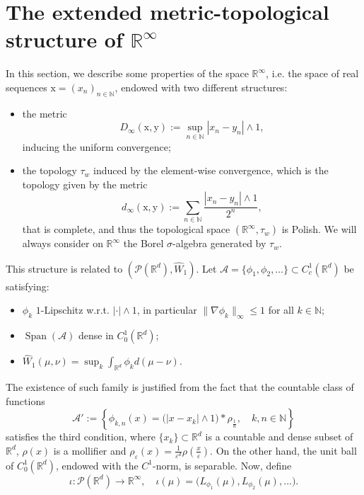 \documentclass[10pt,leqno]{amsart}
\numberwithin{equation}{section}
\newcommand{\R}{\mathbb{R}}
\newcommand{\N}{\mathbb{N}}
\newcommand{\PP}{\mathcal{P}}
\begin{document}
\section{The extended metric-topological structure of \texorpdfstring{$\R^\infty$}{}}\label{appendix R^infty}
In this section, we describe some properties of the space $\R^\infty$, i.e. the space of real sequences $\mathrm{x} = (x_n)_{n\in \N}$, endowed with two different structures:
\begin{itemize}
    \item the metric \begin{equation}\label{eq: distance D_infty}
    D_\infty(\mathrm{x}, \mathrm{y}):= \sup_{n\in \N} |x_n - y_n| \wedge 1,
    \end{equation}
    inducing the uniform convergence;
    \item the topology $\tau_w$ induced by the element-wise convergence, which is the topology given by the metric
    \begin{equation}
        d_\infty(\mathrm{x},\mathrm{y}) := \sum_{n\in \N} \frac{|x_n-y_n|\wedge 1}{2^n},
    \end{equation}
    that is complete, and thus the topological space $(\R^\infty,\tau_w)$ is Polish. We will always consider on $\R^\infty$ the Borel $\sigma$-algebra generated by $\tau_w$.
\end{itemize}



This structure is related to $(\PP(\R^d),\hat{W}_1)$. Let $\mathcal{A}=\{\phi_1,\phi_2,\dots \}\subset C_c^1(\R^d)$ be satisfying:
    \begin{itemize}
        \item[(i)] $\phi_k$ $1$-Lipschitz w.r.t. $|\cdot | \wedge 1$, in particular $\|\nabla\phi_k\|_\infty\leq 1$ for all $k\in \N$;
        \item[(ii)] $\operatorname{Span}(\mathcal{A})$ dense in $C_0^1(\R^d)$;
        \item[(iii)]\label{third property A}$\hat{W}_1(\mu,\nu) = \sup_k\int_{\R^d}\phi_k d(\mu-\nu)$.
    \end{itemize}
    The existence of such family is justified from the fact that the countable class of functions
    \[\mathcal{A}' := \left\{\phi_{k,n}(x) = \big(|x-x_k|\wedge 1 \big)* \rho_{\frac{1}{n}}, \quad k,n\in \N \right\}\]
    satisfies the third condition, where $\{x_k\}\subset \R^d$ is a countable and dense subset of $\R^d$, $\rho(x)$ is a mollifier and $\rho_{\varepsilon}(x) = \frac{1}{\varepsilon^d}\rho(\frac{x}{\varepsilon})$. On the other hand, the unit ball of $C_0^1(\R^d)$, endowed with the $C^1$-norm, is separable. Now, define 
    \begin{equation}\label{appendix: iota Rd}
    \iota:\PP(\R^d) \to \R^\infty, \quad \iota(\mu) = \big(L_{\phi_1}(\mu), L_{\phi_2}(\mu),\dots \big).
    \end{equation}  
\end{document}
